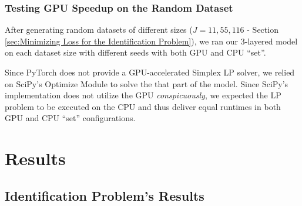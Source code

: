 \documentclass[12pt]{article}
\begin{document}
    \subsubsection{Testing GPU Speedup on the Random Dataset} \label{sec:Pricing Problem-Testing GPU Speedup on the Random Dataset}
    After generating random datasets of different sizes ($J = 11, 55, 116$ - Section \ref{sec:Minimizing Loss for the Identification Problem}), we ran our 3-layered model on each dataset size with different seeds with both GPU and CPU ``set''.
    
    Since PyTorch does not provide a GPU-accelerated Simplex LP solver, we relied on SciPy's Optimize Module to solve the that part of the model. Since SciPy's implementation does not utilize the GPU \textit{conspicuously}, we expected the LP problem to be executed on the CPU and thus deliver equal runtimes in both GPU and CPU ``set'' configurations.
    
    \section{Results} \label{sec:Results}
    \subsection{Identification Problem's Results} \label{sec:Identification Problem's Results}
\end{document}

